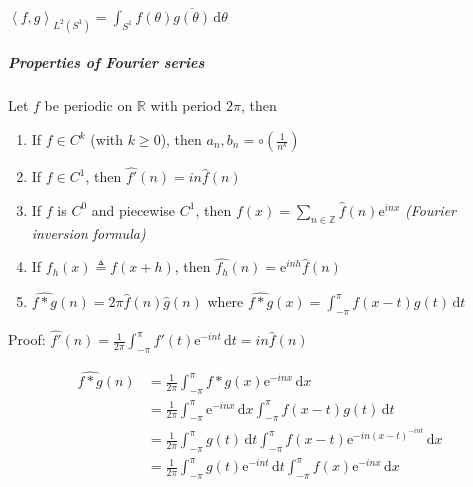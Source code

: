 $\left<f,g\right>_{L^2(S^1)}=\int_{S^1}f(\theta)\overline{g(\theta)}\,\mathrm{d}\theta$

\subparagraph*{Properties of Fourier series}

\begin{theorem}
    Let $f$ be periodic on $\mathbb{R}$ with period $2\pi$, then
    \begin{enumerate}
        \item If $f\in C^k$ (with $k\geq 0$), then $a_n,b_n=\circ\left(\frac{1}{n^k}\right)$
        \item If $f\in C^1$, then $\hat{f'}(n)=in\hat{f}(n)$
        \item If $f$ is $C^0$ and piecewise $C^1$, then $f(x)=\sum_{n\in\mathbb{Z}}\hat{f}(n)\mathrm{e}^{inx}$ \emph{(Fourier inversion formula)}
        \item If $f_h(x)\triangleq f(x+h)$, then $\hat{f_h}(n)=\mathrm{e}^{inh}\hat{f}(n)$
        \item $\widehat{f*g}(n)=2\pi\hat{f}(n)\hat{g}(n)$ where $\widehat{f*g}(x)=\int_{-\pi}^{\pi}f(x-t)g(t)\,\mathrm{d}t$
    \end{enumerate}
\end{theorem}

Proof: $\hat{f'}(n)=\frac{1}{2\pi}\int_{-\pi}^{\pi}f'(t)\mathrm{e}^{-int}\,\mathrm{d}t=in\hat{f}(n)$

\begin{align*}
    \widehat{f*g}(n)
     & =\frac{1}{2\pi}\int_{-\pi}^{\pi}f*g(x)\mathrm{e}^{-inx}\,\mathrm{d}x                                                  \\
     & =\frac{1}{2\pi}\int_{-\pi}^{\pi}\mathrm{e}^{-inx}\,\mathrm{d}x\int_{-\pi}^{\pi}f(x-t)g(t)\,\mathrm{d}t                \\
     & =\frac{1}{2\pi}\int_{-\pi}^{\pi}g(t)\,\mathrm{d}t\int_{-\pi}^{\pi}f(x-t)\mathrm{e}^{-in(x-t)^{-int}}\,\mathrm{d}x     \\
     & =\frac{1}{2\pi}\int_{-\pi}^{\pi}g(t)\mathrm{e}^{-int}\,\mathrm{d}t\int_{-\pi}^{\pi}f(x)\mathrm{e}^{-inx}\,\mathrm{d}x
\end{align*}